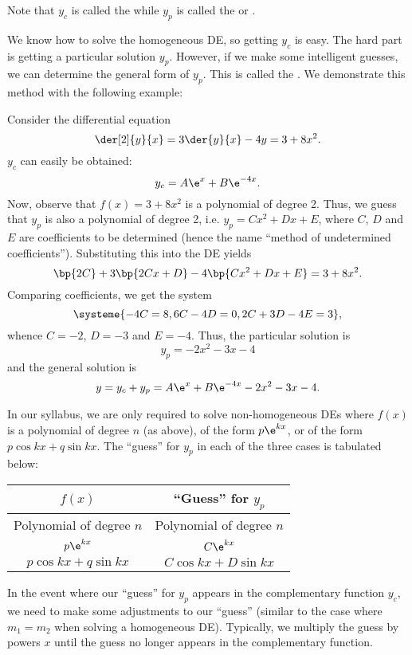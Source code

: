 Note that $y_c$ is called the  while $y_p$ is called the  or .

We know how to solve the homogeneous DE, so getting $y_c$ is easy. The hard part is getting a particular solution $y_p$. However, if we make some intelligent guesses, we can determine the general form of $y_p$. This is called the . We demonstrate this method with the following example:

\begin{example}
    Consider the differential equation \[\der[2]{y}{x} = 3\der{y}{x} - 4y = 3 + 8x^2.\] $y_c$ can easily be obtained: \[y_c = A\e^x + B\e^{-4x}.\] Now, observe that $f(x) = 3 + 8x^2$ is a polynomial of degree 2. Thus, we guess that $y_p$ is also a polynomial of degree 2, i.e. $y_p = Cx^2 + Dx + E$, where $C$, $D$ and $E$ are coefficients to be determined (hence the name ``method of undetermined coefficients''). Substituting this into the DE yields \[\bp{2C} + 3\bp{2Cx + D} - 4\bp{Cx^2 + Dx + E} = 3 + 8x^2.\] Comparing coefficients, we get the system \[\systeme{-4C = 8,6C-4D = 0,2C + 3D - 4E = 3},\] whence $C = -2$, $D = -3$ and $E = -4$. Thus, the particular solution is \[y_p = -2x^2 - 3x - 4\] and the general solution is \[y = y_c + y_p = A\e^x + B\e^{-4x} - 2x^2 - 3x - 4.\]
\end{example}

In our syllabus, we are only required to solve non-homogeneous DEs where $f(x)$ is a polynomial of degree $n$ (as above), of the form $p\e^{kx}$, or of the form $p\cos kx + q\sin kx$. The ``guess'' for $y_p$ in each of the three cases is tabulated below:

\begin{table}[H]
    \centering
    \begin{tabular}{|c|c|}
    \hline
    $f(x)$ & \textbf{``Guess'' for $y_p$} \\ \hline\hline
    Polynomial of degree $n$ & Polynomial of degree $n$ \\ \hline
    $p\e^{kx}$ & $C \e^{kx}$ \\ \hline
    $p \cos kx + q \sin kx$ & $C \cos kx + D \sin kx$ \\ \hline
    \end{tabular}
\end{table}

In the event where our ``guess'' for $y_p$ appears in the complementary function $y_c$, we need to make some adjustments to our ``guess'' (similar to the case where $m_1 = m_2$ when solving a homogeneous DE). Typically, we multiply the guess by powers $x$ until the guess no longer appears in the complementary function.

